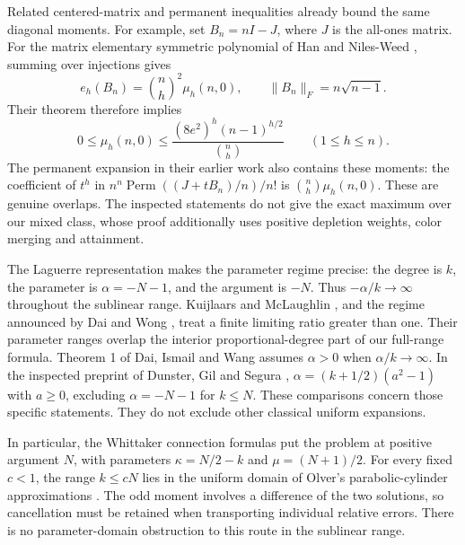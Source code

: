 Related centered-matrix and permanent inequalities already bound the same diagonal moments. For example, set $B_n=nI-J$, where $J$ is the all-ones matrix. For the matrix elementary symmetric polynomial of Han and Niles-Weed \cite[equation (2), Theorem 1.2]{HNcentered}, summing over injections gives
\[
e_h(B_n)=\binom nh^2\mu_h(n,0),\qquad
\|B_n\|_F=n\sqrt{n-1}.
\]
Their theorem therefore implies
\[
0\le\mu_h(n,0)\le
\frac{(8e^2)^h(n-1)^{h/2}}{\binom nh}\qquad(1\le h\le n).
\]
The permanent expansion in their earlier work \cite[equation (29), Lemma 5.5 in the inspected preprint]{HNmixtures} also contains these moments: the coefficient of $t^h$ in
$n^n\operatorname{Perm}((J+tB_n)/n)/n!$ is $\binom nh\mu_h(n,0)$.
These are genuine overlaps. The inspected statements do not give the exact maximum over our mixed class, whose proof additionally uses positive depletion weights, color merging and attainment.

The Laguerre representation makes the parameter regime precise: the degree is $k$, the parameter is $\alpha=-N-1$, and the argument is $-N$. Thus $-\alpha/k\to\infty$ throughout the sublinear range. Kuijlaars and McLaughlin \cite[Theorem 7.1 and Remark 5.4]{KM}, and the regime announced by Dai and Wong \cite{DW}, treat a finite limiting ratio greater than one. Their parameter ranges overlap the interior proportional-degree part of our full-range formula. Theorem 1 of Dai, Ismail and Wang \cite{DIW} assumes $\alpha>0$ when $\alpha/k\to\infty$. In the inspected preprint of Dunster, Gil and Segura \cite[Section 1, equation (1.6) and Cases 1a, 1b and 2]{DGS}, $\alpha=(k+1/2)(a^2-1)$ with $a\ge0$, excluding $\alpha=-N-1$ for $k\le N$. These comparisons concern those specific statements. They do not exclude other classical uniform expansions.

In particular, the Whittaker connection formulas put the problem at positive argument $N$, with parameters $\kappa=N/2-k$ and $\mu=(N+1)/2$. For every fixed $c<1$, the range $k\le cN$ lies in the uniform domain of Olver's parabolic-cylinder approximations \cite{Olver,DLMFWhittaker}. The odd moment involves a difference of the two solutions, so cancellation must be retained when transporting individual relative errors. There is no parameter-domain obstruction to this route in the sublinear range.

